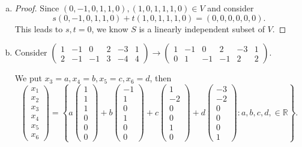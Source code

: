 \begin{Exercise}
	\begin{enumerate}[(a)]
		\item
		\begin{proof}
			Since $(0,-1,0,1,1,0),(1,0,1,1,1,0)\in V$ and consider $$
			s(0,-1,0,1,1,0)+t(1,0,1,1,1,0) = (0,0,0,0,0,0).
			$$
			This leads to $s,t = 0$, we know $S$ is a linearly independent subset of $V$.
		\end{proof}
		
		\item
		\begin{solution}
			Consider
			$\begin{pmatrix}
			1 & -1 & 0 & 2 & -3 & 1 \\
			2 & -1 & -1 & 3 & -4 & 4
			\end{pmatrix} \longrightarrow \begin{pmatrix}
			1 & -1 & 0 & 2 & -3 & 1 \\
			0 & 1 & -1 & -1 & 2 & 2
			\end{pmatrix}$.
			
			We put $x_3 = a, x_4 = b,x_5 = c,x_6=d$, then
			$$
			\begin{pmatrix}
			x_1 \\
			x_2 \\
			x_3 \\
			x_4 \\
			x_5 \\
			x_6
			\end{pmatrix} = \left\{ a\begin{pmatrix}
			1 \\
			1 \\
			1 \\
			0 \\
			0 \\
			0
			\end{pmatrix} + b\begin{pmatrix}
			-1 \\
			1 \\
			0 \\
			1 \\
			0 \\
			0
			\end{pmatrix} + c\begin{pmatrix}
			1 \\
			-2 \\
			0 \\
			0 \\
			1 \\
			0
			\end{pmatrix} + d\begin{pmatrix}
			-3 \\
			-2 \\
			0 \\
			0 \\
			0 \\
			1
			\end{pmatrix} :a,b,c,d,\in\mathbb{R} \right\}.
			$$
			

\end{solution}
\end{enumerate}
\end{Exercise}
